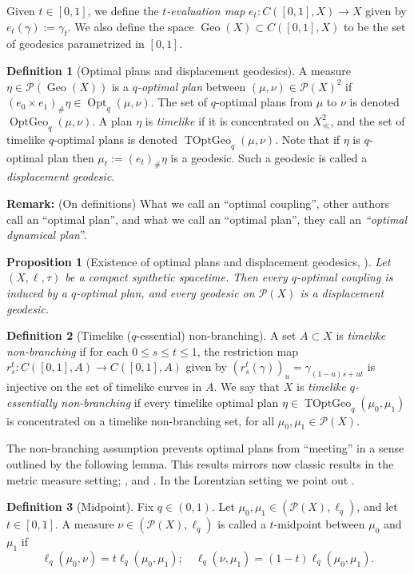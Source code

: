 \documentclass{article}
\newcommand{\Pcal}{\mathcal{P}}
\DeclareMathOperator{\Opt}{Opt}
\DeclareMathOperator{\OptGeo}{OptGeo}
\DeclareMathOperator{\TOptGeo}{TOptGeo}
\DeclareMathOperator{\Geo}{Geo}
\newtheorem{prop}[theorem]{Proposition}
\theoremstyle{definition}
\newtheorem{defn}{Definition}[section]
\begin{document}
{Given $t\in [0,1]$, we define the {\it $t$-evaluation map} $e_t: C([0,1],X)\to X$ given by  $e_t(\gamma):=\gamma_t$. We also define the space $\Geo(X)\subset C([0,1],X)$ to be the set of geodesics parametrized in $[0,1]$. 

\begin{defn}[Optimal plans and displacement geodesics]
A measure $\eta\in \Pcal(\Geo(X))$ is a {\it $q$-optimal plan} between $(\mu,\nu)\in\Pcal(X)^2$ if $(e_0\times e_1)_\# \eta\in \Opt_q(\mu,\nu)$. The set of $q$-optimal plans from $\mu$ to $\nu$ is denoted $\OptGeo_q(\mu,\nu)$.  A plan $\eta$ is {\it timelike} if it is concentrated on $X_\ll^2$, and the set of timelike $q$-optimal plans is denoted $\TOptGeo_q(\mu,\nu)$. Note that if $\eta$ is $q$-optimal plan then $\mu_t:= (e_t)_\#\eta$ is a geodesic. Such a geodesic is called a {\it displacement geodesic}. 
\end{defn}
{\bf Remark:} (On definitions) What we call an ``optimal coupling'', other authors call an ``optimal plan'', and what we call an 		``optimal plan'', they call an {\it ``optimal dynamical plan}''. 

\begin{prop}[Existence of optimal plans and displacement geodesics, ]\label{optimalplanprop}
Let $(X,\ell, \tau)$ be a compact synthetic spacetime. Then every $q$-optimal coupling is induced by a $q$-optimal plan, and every geodesic on $\Pcal(X)$ is a displacement geodesic. 
\end{prop}




\begin{defn}[Timelike ($q$-essential) non-branching]\label{nonbranchingdef}
A set $A\subset X$ is {\it timelike non-branching} if for each $0\leq s\leq t\leq 1$, the restriction map $r_s^t: C([0,1],A)\to C([0,1],A)$ given by $(r_s^t(\gamma))_u=\gamma_{(1-u)s+ut}$ is injective on the set of timelike curves in $A$. We say that $X$ is {\it timelike $q$-essentially non-branching} if every timelike optimal plan $\eta\in \TOptGeo_q(\mu_0,\mu_1)$ is concentrated on a timelike non-branching set, for all $\mu_0,\mu_1\in\Pcal(X)$.
\end{defn}

The non-branching assumption prevents optimal plans from ``meeting'' in a sense outlined by the following lemma. This results mirrors now classic results in the metric measure setting; \cite[Lem.\ 2.6]{BacherSturm}, and \cite[Lem.\ 2.11]{SturmII}. In the Lorentzian setting we point out \cite[Lem.\ 2.23]{Braun}.
\begin{defn}[Midpoint]
Fix $q\in (0,1)$. Let $\mu_0,\mu_1\in (\Pcal(X), \ell_q)$, and let $t\in [0,1]$. A measure $\nu\in(\Pcal(X), \ell_q)$ is called a $t$-midpoint between $\mu_0$ and $\mu_1$ if 
\[\ell_q(\mu_0, \nu)=t\ell_q(\mu_0, \mu_1); \quad \ell_q(\nu,\mu_1)=(1-t)\ell_q(\mu_0, \mu_1).\]
\end{defn}

}
\end{document}
